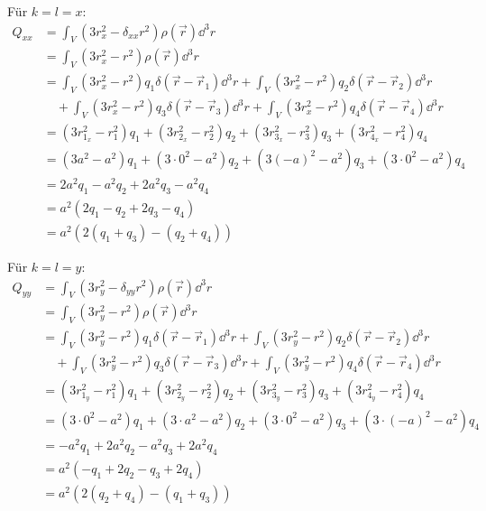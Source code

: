 \documentclass[sectionformat=aufgabe]{gadsescript}
\begin{document}
\begin{enumerate}[label=\alph*)]
		Für $ k = l = x $:
		\begin{align*}
			Q_{xx} &= \int _V (3r_x^2 - \delta_{xx}r^2)\rho(\vec r) \dd ^3 r \\
			&= \int _V (3r_x^2 - r^2)\rho(\vec r) \dd^3 r \\
			&= \int _V (3r_x^2 - r^2) q_1 \delta(\vec r - \vec r_1) \dd^3 r + \int _V (3r_x^2 - r^2) q_2 \delta(\vec r - \vec r_2) \dd^3 r \\
			&\quad + \int _V (3r_x^2 - r^2) q_3 \delta(\vec r - \vec r_3) \dd^3 r + \int _V (3r_x^2 - r^2) q_4 \delta(\vec r - \vec r_4) \dd^3 r \\
			&= (3 r_{1_x} ^2 - r_1^2) q_1 + (3 r_{2_x} ^2 - r_2^2) q_2 + (3 r_{3_x} ^2 - r_3^2) q_3 + (3 r_{4_x} ^2 - r_4^2) q_4  \\
			&= (3 a^2 - a^2) q_1 + (3 \cdot 0^2 - a^2) q_2 + (3 (-a) ^2 - a^2) q_3 + (3 \cdot 0 ^2 - a^2) q_4  \\
			&= 2 a^2 q_1 - a^2 q_2 + 2a^2 q_3 - a^2 q_4  \\
			&= a^2 (2 q_1 - q_2 + 2 q_3 - q_4)  \\
			&= a^2 (2 (q_1 + q_3) - (q_2 + q_4)) 
		\end{align*}
		
		Für $ k = l = y $:
		\begin{align*}
			Q_{yy} &= \int _V (3r_y^2 - \delta_{yy}r^2)\rho(\vec r) \dd ^3 r \\
			&= \int _V (3r_y^2 - r^2)\rho(\vec r) \dd^3 r \\
			&= \int _V (3r_y^2 - r^2) q_1 \delta(\vec r - \vec r_1) \dd^3 r + \int _V (3r_y^2 - r^2) q_2 \delta(\vec r - \vec r_2) \dd^3 r \\
			&\quad + \int _V (3r_y^2 - r^2) q_3 \delta(\vec r - \vec r_3) \dd^3 r + \int _V (3r_y^2 - r^2) q_4 \delta(\vec r - \vec r_4) \dd^3 r \\
			&= (3 r_{1_y} ^2 - r_1^2) q_1 + (3 r_{2_y} ^2 - r_2^2) q_2 + (3 r_{3_y} ^2 - r_3^2) q_3 + (3 r_{4_y} ^2 - r_4^2) q_4  \\
			&= (3 \cdot 0^2 - a^2) q_1 + (3 \cdot a^2 - a^2) q_2 + (3 \cdot 0 ^2 - a^2) q_3 + (3 \cdot (-a) ^2 - a^2) q_4  \\
			&= -a^2 q_1 + 2a^2 q_2 - a^2 q_3 + 2a^2 q_4  \\
			&= a^2 (- q_1 + 2q_2 - q_3 + 2 q_4)  \\
			&= a^2 (2 (q_2 + q_4) - (q_1 + q_3)) 
		\end{align*}


\end{enumerate}
\end{document}
